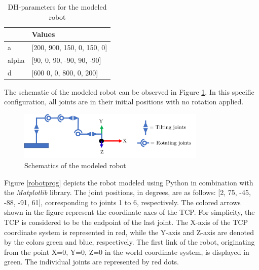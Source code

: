 \begin{table}[H]
	\centering
	\begin{tabular}{||l|l||}
		  & Values \\
		\hline
		\hline
		\hline
		a	&		[200, 900, 150, 0,   150, 0] \\
		alpha	&  	[90,  0,   90,  -90, 90,  -90] \\
		d	& 		[600  0,   0,   800, 0,   200]\\
		
		\hline
		\hline
	\end{tabular}
	
	\caption{DH-parameters for the modeled robot}
	\label{DHp}
\end{table}

The schematic of the modeled robot can be observed in Figure \ref{schema}. In this specific configuration, all joints are in their initial positions with no rotation applied.

\begin{figure}[H]
	\centerline{\includegraphics[width=0.8\textwidth]{figures/schema.png}}
	\caption{Schematics of the modeled robot}
	\label{schema}
\end{figure}

Figure \ref{robotprog} depicts the robot modeled using Python in combination with the \textit{Matplotlib} library. The joint positions, in degrees, are as follows: [2, 75, -45, -88, -91, 61], corresponding to joints 1 to 6, respectively. The colored arrows shown in the figure represent the coordinate axes of the \acrshort{TCP}. For simplicity, the \acrshort{TCP} is considered to be the endpoint of the last joint. The X-axis of the \acrshort{TCP} coordinate system is represented in red, while the Y-axis and Z-axis are denoted by the colors green and blue, respectively. The first link of the robot, originating from the point X=0, Y=0, Z=0 in the world coordinate system, is displayed in green. The individual joints are represented by red dots.

\newpage

